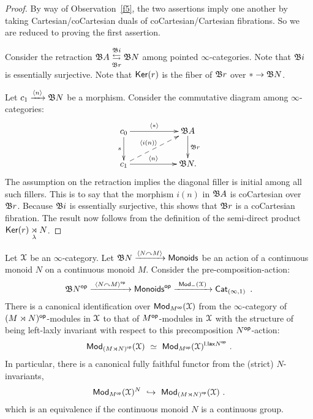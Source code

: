 \begin{proof}
By way of Observation~\ref{f5}, the two assertions imply one another by taking Cartesian/coCartesian duals of coCartesian/Cartesian fibrations.
So we are reduced to proving the first assertion.

Consider the retraction $\mathfrak B A \overset{\mathfrak B i}{\underset{\mathfrak B r} \leftrightarrows} \mathfrak B N$ among pointed $\infty$-categories.
Note that $\mathfrak B i$ is essentially surjective.  
Note that $\operatorname{\sf Ker}(r)$ is the fiber of $\mathfrak B r$ over $\ast \to \mathfrak B N$.

Let $c_1 \xrightarrow{\langle n \rangle} \mathfrak B N$ be a morphism.
Consider the commutative diagram among $\infty$-categories:
\[
\xymatrix{
c_0
\ar[rr]^-{\lag \ast \rag}
\ar[d]_-{s}
&&
\fB A
\ar[d]^-{\fB r}
\\
c_1
\ar[rr]^-{\lag n \rag}
\ar@{-->}[urr]^-{\lag i(n) \rag}
&&
\fB N
.
}
\]
The assumption on the retraction implies the diagonal filler is initial among all such fillers.
This is to say that the morphism $i(n)$ in $\mathfrak B A$ is coCartesian over $\mathfrak B r$. 
Because $\mathfrak B i$ is essentially surjective, this shows that $\mathfrak B r$ is a coCartesian fibration.
The result now follows from the definition of the semi-direct product $\operatorname{\sf Ker}(r) \underset{\lambda} \rtimes N$.    

\end{proof}







\begin{prop}
\label{t65}
Let $\mathcal X$ be an $\infty$-category.
Let $\mathfrak B N \xrightarrow{\langle  N \curvearrowright M \rangle} {\sf Monoids}$ be an action of a continuous monoid $N$ on a continuous monoid $M$.
Consider the pre-composition-action:
\[
\mathfrak B N^{\operatorname{\mathsf{op}}}
\xrightarrow{~ \langle N \curvearrowright M \rangle^{\operatorname{\mathsf{op}}}~ } 
{\sf Monoids}^{\operatorname{\mathsf{op}}}
\xrightarrow{~\operatorname{\sf Mod}_{-}(\mathcal X)~}
\operatorname{{\sf Cat}}_{(\infty,1)}
~.
\]
There is a canonical identification over $\operatorname{\sf Mod}_{M^{\operatorname{\mathsf{op}}}}(\mathcal X)$ from the $\infty$-category of $(M \rtimes N)^{\operatorname{\mathsf{op}}}$-modules in $\mathcal X$ to that of $M^{\operatorname{\mathsf{op}}}$-modules in $\mathcal X$ with the structure of being left-laxly invariant with respect to this precomposition $N^{\operatorname{\mathsf{op}}}$-action:
\[
\operatorname{\sf Mod}_{
\left(
M \rtimes N
\right)^{\operatorname{\mathsf{op}}}
}(\mathcal X)
~\simeq~
\operatorname{\sf Mod}_{M^{\operatorname{\mathsf{op}}}}(\mathcal X)^{{\sf l.lax} N^{\operatorname{\mathsf{op}}}}
~.
\]
In particular, there is a canonical fully faithful functor from the (strict) $N$-invariants,
\[
\operatorname{\sf Mod}_{M^{\operatorname{\mathsf{op}}}}(\mathcal X)^{N}
~\hookrightarrow~
\operatorname{\sf Mod}_{\left( M \rtimes N\right)^{\operatorname{\mathsf{op}}}}(\mathcal X)
~.
\]
which is an equivalence if the continuous monoid $N$ is a continuous group.


\end{prop}





